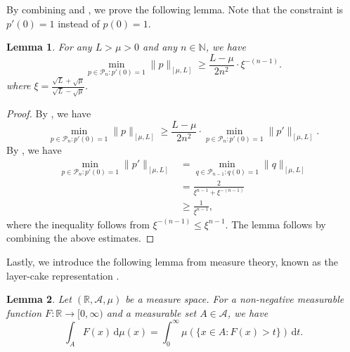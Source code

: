 \documentclass[11pt]{article}
\newcommand{\R}{\mathbb{R}}
\newcommand{\N}{\mathbb{N}}
\newcommand{\du}{\mathrm{d}}
\newcommand{\norm}[1]{\lVert#1\rVert}
\newtheorem{lemma}{Lemma}[section]
\begin{document}
By combining  and , we prove the following lemma.
Note that the constraint is $p'(0)=1$ instead of $p(0)=1$.

\begin{lemma}\label{lem:minimum_norm_polynomial_derivative}
For any $L>\mu>0$ and any $n\in\N$, we have
\[
	\min_{ p\in \mathscr{P}_n: p'(0)=1 } \norm{p}_{ [\mu,L] }
    \geq \frac{L-\mu}{2n^2}\cdot\xi^{-(n-1)}.
\]
where $\xi = \frac{\sqrt{L}+\sqrt{\mu}}{\sqrt{L} - \sqrt{\mu}}$.
\end{lemma}
\begin{proof}
By , we have
\[
	\min_{ p\in \mathscr{P}_n: p'(0)=1 } \norm{p}_{ [\mu,L] }
	\geq
	\frac{L-\mu}{2n^2} \cdot \min_{ p\in \mathscr{P}_n: p'(0)=1 } \norm{p'}_{ [\mu,L] }.
\]
By , we have
\begin{align*}
	\min_{ p\in \mathscr{P}_n: p'(0)=1 } \norm{p'}_{ [\mu,L] }
	&= \min_{ q\in \mathscr{P}_{n-1}: q(0)=1 } \norm{q}_{ [\mu,L] }  \\
	&= \frac{2}{\xi^{n-1} + \xi^{-(n-1)} } \\
	&\geq \frac{1}{\xi^{n-1}},
\end{align*}
where the inequality follows from $\xi^{-(n-1)} \leq \xi^{n-1}$.
The lemma follows by combining the above estimates.
\end{proof}





Lastly, we introduce the following lemma from measure theory, known as the layer-cake representation \cite{lieb:2001}.

\begin{lemma}\label{lem:layer_cake}
Let $(\R, \mathcal{A}, \mu)$ be a measure space.
For a non-negative measurable function $F:\R\to[0,\infty)$ and a measurable set $A\in\mathcal{A}$, we have
\[
	\int_{A} F(x)\, \du \mu(x) = \int_0^\infty \mu\left( \{ x\in A: F(x) > t \} \right)\,\du t.
\]
\end{lemma}
\end{document}
